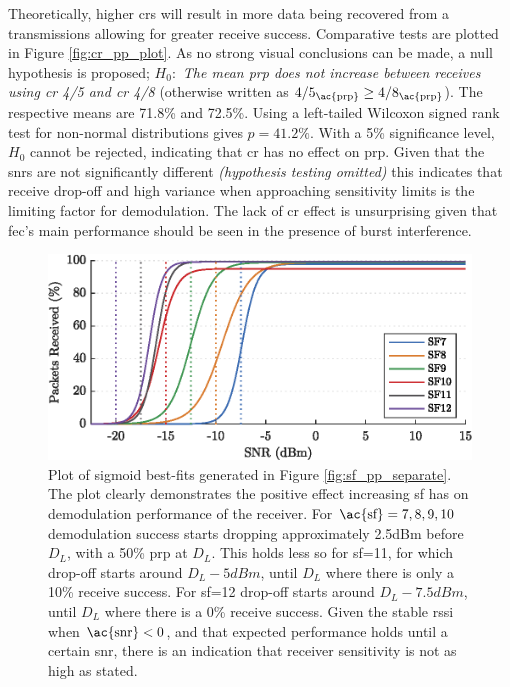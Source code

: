 Theoretically, higher \ac{cr}s will result in more data being recovered from a transmissions allowing for greater receive success. Comparative tests are plotted in Figure \ref{fig:cr_pp_plot}. As no strong visual conclusions can be made, a null hypothesis is proposed; $H_{0} : $ \textit{The mean \ac{prp} does not increase between receives using \ac{cr} 4/5 and \ac{cr} 4/8} (otherwise written as $4/5_{\text{\ac{prp}}} \geq 4/8_{\text{\ac{prp}}}$). The respective means are 71.8\% and 72.5\%. Using a left-tailed Wilcoxon signed rank test for non-normal distributions gives $p=41.2\%$. With a 5\% significance level,  $H_{0}$ cannot be rejected, indicating that \ac{cr} has no effect on \ac{prp}.  Given that the \ac{snr}s are not significantly different \textit{(hypothesis testing omitted)} this indicates that receive drop-off and high variance when approaching sensitivity limits is the limiting factor for demodulation. The lack of \ac{cr} effect is unsurprising given that \ac{fec}'s main performance should be seen in the presence of burst interference.

\begin{figure}[H]
    \centering
   	\includegraphics{Figures/sf_fit_plot}
    \caption[Sigmoid best-fits for \ac{snr} vs \ac{prp}]{
    Plot of sigmoid best-fits generated in Figure \ref{fig:sf_pp_separate}. The plot clearly demonstrates the positive effect increasing \ac{sf} has on demodulation performance of the receiver. For $\text{\ac{sf}}=7,8,9,10$ demodulation success starts dropping approximately 2.5dBm before $D_L$, with a 50\% \ac{prp} at $D_L$. This holds less so for \ac{sf}=11, for which drop-off starts around $D_L - 5dBm$, until $D_L$ where there is only a 10\% receive success. For \ac{sf}=12 drop-off starts around $D_L - 7.5dBm$, until $D_L$ where there is a 0\% receive success. Given the stable \ac{rssi} when $\text{\ac{snr}} < 0$, and that expected performance holds until a certain \ac{snr}, there is an indication that receiver sensitivity is not as high as stated.
     }
    \label{fig:sf_pp_fit}
\end{figure}

